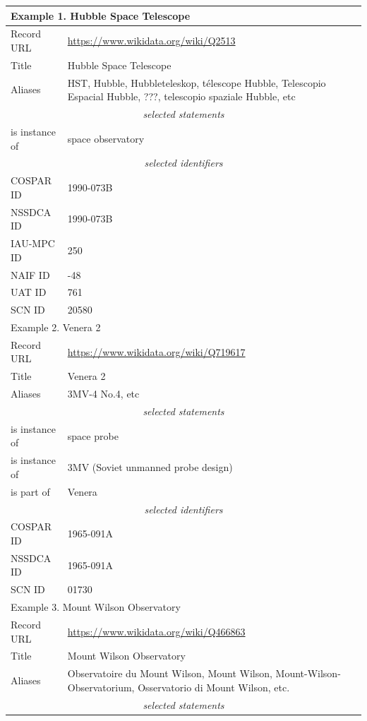 \documentclass[11pt,a4paper]{ivoa}
\begin{document}
\noindent\begin{longtable}{p{}p{}}
\hline
\hline
\multicolumn{2}{l}{\bf Example 1. Hubble Space Telescope}\\
\hline
Record URL & \url{https://www.wikidata.org/wiki/Q2513}\\
Title      & Hubble Space Telescope \\
Aliases    & HST, Hubble, Hubbleteleskop, t\'elescope Hubble, Telescopio Espacial Hubble, ???, telescopio spaziale Hubble, etc\\
\multicolumn{2}{c}{\sl selected statements}\\
is instance of & space observatory \\
\multicolumn{2}{c}{\sl selected identifiers}\\
COSPAR ID  & 1990-073B \\
NSSDCA ID  & 1990-073B \\
IAU-MPC ID & 250\\
NAIF ID    & -48\\
UAT ID     & 761\\
SCN ID     & 20580 \\
\hline
\hline
\multicolumn{2}{l}{Example 2. Venera 2}\\
\hline
Record URL & \url{https://www.wikidata.org/wiki/Q719617}\\
Title      & Venera 2\\
Aliases    & 3MV-4 No.4, etc\\
\multicolumn{2}{c}{\sl selected statements}\\
is instance of & space probe \\
is instance of & 3MV (Soviet unmanned probe design) \\
is part of     & Venera \\
\multicolumn{2}{c}{\sl selected identifiers}\\
COSPAR ID  & 1965-091A \\
NSSDCA ID  & 1965-091A \\
SCN ID     & 01730 \\
\hline
\hline
\multicolumn{2}{l}{Example 3. Mount Wilson Observatory}\\
\hline
Record URL & \url{https://www.wikidata.org/wiki/Q466863}\\
Title      & Mount Wilson Observatory\\
Aliases    & Observatoire du Mount Wilson, Mount Wilson, Mount-Wilson-Observatorium, Osservatorio di Mount Wilson, etc.\\
\multicolumn{2}{c}{\sl selected statements}\\

\end{longtable}
\end{document}
